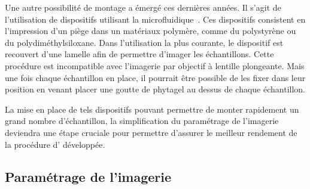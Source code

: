 \documentclass[\main/main.tex]{subfiles}
\begin{document}
%
Une autre possibilité de montage a émergé  ces dernières années.
%
Il s'agit de l'utilisation de dispositifs utilisant la microfluidique~\cite{khalili_2019}.
%
Ces dispositifs consistent en l'impression d'un piège dans un matériaux polymère, comme du polystyrène ou du polydiméthylsiloxane.
%
Dans l'utilisation la plus courante, le dispositif est recouvert d'une lamelle afin de permettre d'imager les échantillons.
%
Cette procédure est incompatible avec l'imagerie par objectif à lentille plongeante.
%
Mais une fois chaque échantillon en place,
il pourrait être possible de les fixer dans leur position en venant placer une goutte de phytagel au dessus de chaque échantillon.
%

La mise en place de tels dispositifs pouvant permettre de monter rapidement un grand nombre d'échantillon,
la simplification du paramétrage de l'imagerie deviendra une étape cruciale pour permettre d'assurer le meilleur rendement de la procédure d'\hti{} développée.

    \subsection{Paramétrage de l'imagerie}
\end{document}
